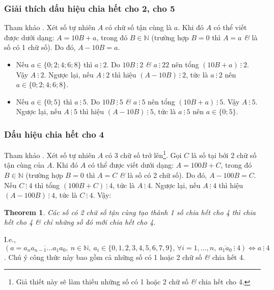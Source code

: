 \documentclass{article}
\numberwithin{equation}{section}
\newtheorem{theorem}{Theorem}[section]
\begin{document}
\subsubsection{Giải thích dấu hiệu chia hết cho 2, cho 5}
Tham khảo \cite[p. 37]{Thai_Anh_Dat_Ha_Loan_Nam_Quang_Toan_6_tap_1}. Xét số tự nhiên $A$ có chữ số tận cùng là $a$. Khi đó $A$ có thể viết được dưới dạng: $A = 10B + a$, trong đó $B\in\mathbb{N}$ (trường hợp $B = 0$ thì $A = a$ \textit{\&} là số có 1 chữ số). Do đó, $A - 10 B = a$.
\begin{itemize}
	\item Nếu $a\in\{0;2;4;6;8\}$ thì $a\ \vdots\ 2$. Do $10B\ \vdots\ 2$ \textit{\&} $a\ \vdots\ 2 2$ nên tổng $(10B + a)\ \vdots\ 2$. Vậy $A\ \vdots\ 2$. Ngược lại, nếu $A\ \vdots\ 2$ thì hiệu $(A - 10B)\ \vdots\ 2$, tức là $a\ \vdots\ 2$ nên $a\in\{0;2;4;6;8\}$.
	\item Nếu $a\in\{0;5\}$ thì $a\ \vdots\ 5$. Do $10B\ \vdots\ 5$ \textit{\&} $a\ \vdots\ 5$ nên tổng $(10B + a)\ \vdots\ 5$. Vậy $A\ \vdots\ 5$. Ngược lại, nếu $A\ \vdots\ 5$ thì hiệu $(A - 10B)\ \vdots\ 5$, tức là $a\ \vdots\ 5$ nên $a\in\{0;5\}$.
\end{itemize}

\subsubsection{Dấu hiệu chia hết cho 4}
Tham khảo \cite[p. 37]{Thai_Anh_Dat_Ha_Loan_Nam_Quang_Toan_6_tap_1}. Xét số tự nhiên $A$ có 3 chữ số trở lên\footnote{Giả thiết này sẽ làm thiếu những số có 1 hoặc 2 chữ số \textit{\&} chia hết cho 4.}. Gọi $C$ là số tại bởi 2 chữ số tận cùng của $A$. Khi đó $A$ có thể được viết dưới dạng: $A = 100B + C$, trong đó $B\in\mathbb{N}$ (trường hợp $B = 0$ thì $A = C$ \textit{\&} là số có 2 chữ số). Do đó, $A - 100B = C$. Nếu $C\ \vdots\ 4$ thì tổng $(100B + C)\ \vdots\ 4$, tức là $A\ \vdots\ 4$. Ngược lại, nếu $A\ \vdots\ 4$ thì hiệu $(A - 100B)\ \vdots\ 4$, tức là $C\ \vdots\ 4$. Vậy:

\begin{theorem}
	Các số có 2 chữ số tận cùng tạo thành 1 số chia hết cho 4 thì chia hết cho 4 \textit{\&} chỉ những số đó mới chia hết cho 4.
\end{theorem}
I.e., $(a = \overline{a_na_{n-1}\ldots a_1a_0},\ n\in\mathbb{N},\ a_i\in\{0,1,2,3,4,5,6,7,9\},\,\forall i = 1,\ldots,n,\ \overline{a_1a_0}\ \vdots\ 4)\Leftrightarrow a\ \vdots\ 4$. Chú ý công thức này bao gồm cả những số có 1 hoặc 2 chữ số \textit{\&} chia hết 4.
\end{document}
